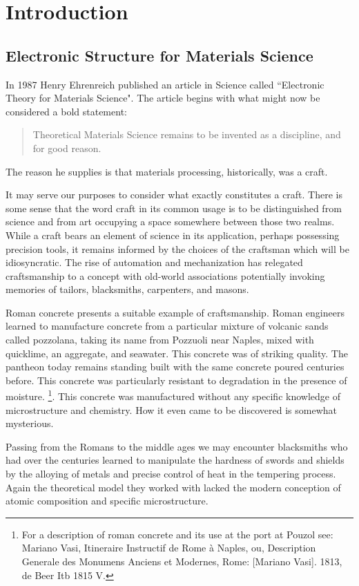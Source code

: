 \chapter{Introduction}
\section{Electronic Structure for Materials Science}
In 1987 Henry Ehrenreich published an article in Science called
``Electronic Theory for Materials Science". The article begins
with what might now be considered a bold statement:

\begin{quote}
Theoretical Materials Science remains to be invented as a discipline, and for good reason.
\end{quote}

The reason he supplies is that materials processing, historically, was a craft. 

It may serve our purposes to consider what exactly constitutes a craft. 
There is some sense that the word craft in its common usage 
is to be distinguished from science and from art occupying a space 
somewhere between those two realms. While a craft bears an element of science
in its application, perhaps possessing precision tools, it remains 
informed by the choices of the craftsman which
will be idiosyncratic. The rise of automation and mechanization has relegated
craftsmanship to a concept with old-world associations potentially 
invoking memories of tailors, blacksmiths, carpenters, and masons.

Roman concrete presents a suitable example of craftsmanship.
Roman engineers learned to manufacture concrete from a 
particular mixture of volcanic sands called pozzolana,
taking its name from Pozzuoli near Naples, mixed with quicklime, an aggregate, and seawater.
This concrete was of striking quality. The pantheon today remains standing 
built with the same concrete poured centuries before.
This concrete was particularly resistant to degradation in the presence of moisture.
\footnote{For a description of roman concrete and its use at the port at Pouzol see: Mariano Vasi, 
Itineraire Instructif de Rome à Naples, ou, Description Generale des Monumens Anciens et Modernes, 
Rome: [Mariano Vasi]. 1813, de Beer Itb 1815 V.}. 
This concrete was manufactured without any specific knowledge of microstructure and 
chemistry. How it even came to be discovered is somewhat mysterious.

Passing from the Romans to the middle ages we may encounter blacksmiths 
who had over the centuries learned to manipulate the 
hardness of swords and shields by the alloying of metals and precise 
control of heat in the tempering process. Again the theoretical model 
they worked with lacked the modern conception of 
atomic composition and specific microstructure.

